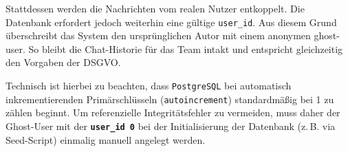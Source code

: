 Stattdessen werden die Nachrichten vom realen Nutzer entkoppelt. Die Datenbank erfordert jedoch weiterhin eine gültige \texttt{user\_id}. Aus diesem Grund überschreibt das System den ursprünglichen Autor mit einem anonymen \gls{ghost-user}. So bleibt die Chat-Historie für das Team intakt und entspricht gleichzeitig den Vorgaben der \gls{DSGVO}.
 
Technisch ist hierbei zu beachten, dass \texttt{PostgreSQL} bei automatisch inkrementierenden Primärschlüsseln (\texttt{autoincrement}) standardmäßig bei 1 zu zählen beginnt. Um referenzielle Integritätsfehler zu vermeiden, muss daher der Ghost-User mit der \textbf{\texttt{user\_id 0}} bei der Initialisierung der Datenbank (z.\,B. via Seed-Script) einmalig manuell angelegt werden.